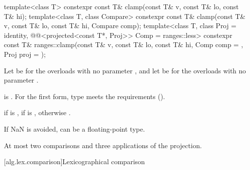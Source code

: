 %
\begin{itemdecl}
template<class T>
  constexpr const T& clamp(const T& v, const T& lo, const T& hi);
template<class T, class Compare>
  constexpr const T& clamp(const T& v, const T& lo, const T& hi, Compare comp);
template<class T, class Proj = identity,
         @@<projected<const T*, Proj>> Comp = ranges::less>
  constexpr const T&
    ranges::clamp(const T& v, const T& lo, const T& hi, Comp comp = {}, Proj proj = {});
\end{itemdecl}

\begin{itemdescr}
\pnum
Let  be 
for the overloads with no parameter ,
and let  be 
for the overloads with no parameter .

\pnum
\expects
{} is .
For the first form, type 
meets the 
requirements ().

\pnum
\returns
{} if  is ,
 if  is ,
otherwise .

\pnum
\begin{note}
If NaN is avoided,  can be a floating-point type.
\end{note}

\pnum
\complexity
At most two comparisons and three applications of the projection.
\end{itemdescr}

[alg.lex.comparison]{Lexicographical comparison}

